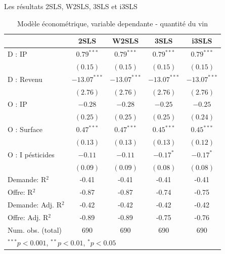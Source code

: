 \documentclass[11pt,ignorenonframetext,]{beamer}
\begin{document}
\begin{frame}{Les résultats 2SLS, W2SLS, 3SLS et i3SLS}
\protect\hypertarget{les-resultats-2sls-w2sls-3sls-et-i3sls}{}

\tiny

\begin{table}
\begin{center}
\begin{tabular}{l c c c c }
\hline
 & 2SLS & W2SLS & 3SLS & i3SLS \\
\hline
D : IP              & $0.79^{***}$   & $0.79^{***}$   & $0.79^{***}$   & $0.79^{***}$   \\
                    & $(0.15)$       & $(0.15)$       & $(0.15)$       & $(0.15)$       \\
D : Revenu          & $-13.07^{***}$ & $-13.07^{***}$ & $-13.07^{***}$ & $-13.07^{***}$ \\
                    & $(2.76)$       & $(2.76)$       & $(2.76)$       & $(2.76)$       \\
O : IP              & $-0.28$        & $-0.28$        & $-0.25$        & $-0.25$        \\
                    & $(0.25)$       & $(0.25)$       & $(0.25)$       & $(0.24)$       \\
O : Surface         & $0.47^{***}$   & $0.47^{***}$   & $0.45^{***}$   & $0.45^{***}$   \\
                    & $(0.13)$       & $(0.13)$       & $(0.13)$       & $(0.12)$       \\
O : I pésticides    & $-0.11$        & $-0.11$        & $-0.17^{*}$    & $-0.17^{*}$    \\
                    & $(0.09)$       & $(0.09)$       & $(0.08)$       & $(0.08)$       \\
\hline
Demande: R$^2$      & -0.41          & -0.41          & -0.41          & -0.41          \\
Offre: R$^2$        & -0.87          & -0.87          & -0.74          & -0.75          \\
Demande: Adj. R$^2$ & -0.42          & -0.42          & -0.42          & -0.42          \\
Offre: Adj. R$^2$   & -0.89          & -0.89          & -0.75          & -0.76          \\
Num. obs. (total)   & 690            & 690            & 690            & 690            \\
\hline
\multicolumn{5}{l}{\scriptsize{$^{***}p<0.001$, $^{**}p<0.01$, $^*p<0.05$}}
\end{tabular}
\caption{Modèle économétrique, variable dependante - quantité du vin}
\label{table : 2sls, w2sls, 3sls and fiml}
\end{center}
\end{table}

\normalsize

\end{frame}
\end{document}
